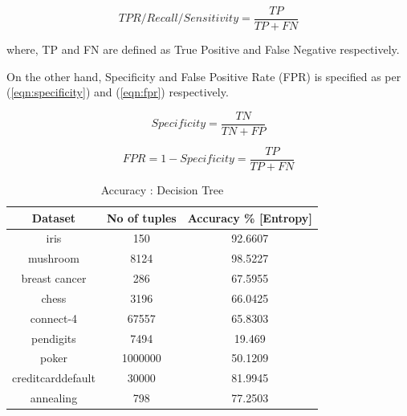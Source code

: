 \documentclass[12pt]{article}
\begin{document}
\begin{equation}
\label{eqn:tpr}
TPR / Recall / Sensitivity = \frac{TP}{TP + FN}
\end{equation} 

where, TP and FN are defined as True Positive and False Negative respectively.

On the other hand, Specificity and False Positive Rate (FPR) is specified as per (\ref{eqn:specificity}) and (\ref{eqn:fpr}) respectively.

\begin{equation}
\label{eqn:specificity}
Specificity = \frac{TN}{TN + FP}
\end{equation} 

\begin{equation}
\label{eqn:fpr}
FPR = 1 - Specificity
= \frac{TP}{TP + FN}
\end{equation} 

\begin{table}[H]
	\caption{Accuracy : Decision Tree}
	\centering
	\begin{tabular}{|c|c|c|}
		\hline
		\textbf{Dataset}  & \textbf{No of tuples} & \textbf{Accuracy \% {[}Entropy{]}} \\ \hline
		iris              & 150                   & 92.6607                            \\ \hline
		mushroom          & 8124                  & 98.5227                            \\ \hline
		breast cancer     & 286                   & 67.5955                            \\ \hline
		chess             & 3196                  & 66.0425                            \\ \hline
		connect-4         & 67557                 & 65.8303                            \\ \hline
		pendigits         & 7494                  & 19.469                             \\ \hline
		poker             & 1000000               & 50.1209                            \\ \hline
		creditcarddefault & 30000                 & 81.9945                            \\ \hline
		annealing         & 798                   & 77.2503                            \\ \hline
	\end{tabular}
\end{table}
\end{document}
